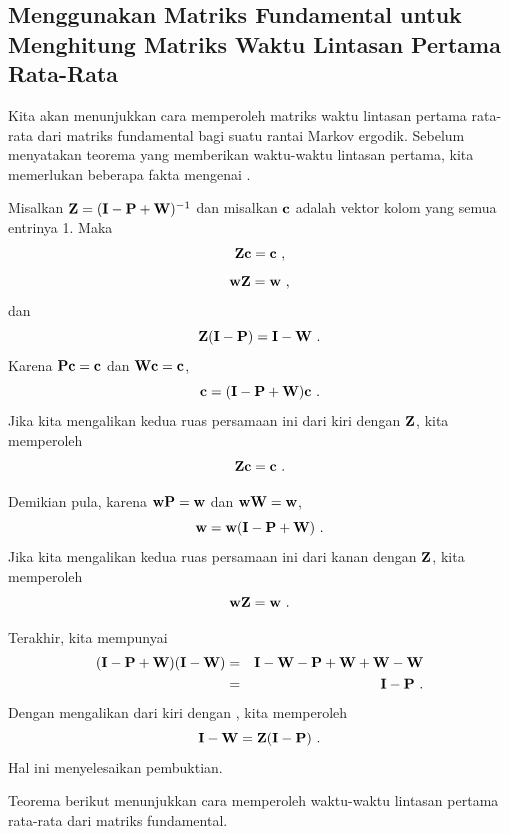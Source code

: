 \subsection*{Menggunakan Matriks Fundamental untuk Menghitung Matriks Waktu
Lintasan Pertama Rata-Rata}

Kita akan menunjukkan cara memperoleh matriks waktu lintasan pertama rata-rata
 dari matriks fundamental  bagi suatu rantai Markov ergodik.
Sebelum menyatakan teorema yang memberikan waktu-waktu lintasan pertama, kita
memerlukan beberapa fakta mengenai .

\begin{lemma}\label{thm 11.5.18}
Misalkan ${\mbox{\bf Z}\/} = ({\mbox{\bf I}\/} - {\mbox{\bf P}\/} + {\mbox{\bf W}\/})^{-1}$ dan misalkan ${\mbox{\bf c}\/}$
adalah vektor kolom yang semua entrinya 1. Maka
$$\mat{Z}\mat{c} = \mat{c}\ ,$$
$$\mat{w}\mat{Z} = \mat{w}\ ,$$
dan
$${\mbox{\bf Z}\/}({\mbox{\bf I}\/} - {\mbox{\bf P}\/}) = {\mbox{\bf I}\/} - {\mbox{\bf W}\/}\ .$$
\proof
Karena ${\mbox{\bf P}\/}{\mbox{\bf c}\/} = {\mbox{\bf c}\/}$ dan ${\mbox{\bf W}\/}{\mbox{\bf c}\/} = {\mbox{\bf c}\/}$,
$$\mat{c} = (\mat{I} - \mat{P} + \mat{W}) \mat{c}\ .$$
Jika kita mengalikan kedua ruas persamaan ini dari kiri dengan ${\mbox{\bf Z}\/}$, kita
memperoleh
$${\mbox{\bf Z}\/}{\mbox{\bf c}\/} = {\mbox{\bf c}\/}\ .$$
\par
Demikian pula, karena ${\mbox{\bf w}\/}{\mbox{\bf P}\/} = {\mbox{\bf w}\/}$ dan
${\mbox{\bf w}\/}{\mbox{\bf W}\/} = {\mbox{\bf w}\/}$,
$${\mbox{\bf w}\/} = {\mbox{\bf w}\/}({\mbox{\bf I}\/} - {\mbox{\bf P}\/} + {\mbox{\bf W}\/})\ .$$
Jika kita mengalikan kedua ruas persamaan ini dari kanan dengan ${\mbox{\bf Z}\/}$, kita
memperoleh
$${\mbox{\bf w}\/}{\mbox{\bf Z}\/} = {\mbox{\bf w}\/}\ .$$
\par
Terakhir, kita mempunyai
\begin{eqnarray*}
({\mbox{\bf I}\/} - {\mbox{\bf P}\/} + {\mbox{\bf W}\/})({\mbox{\bf I}\/} - {\mbox{\bf W}\/}) &=& 
{\mbox{\bf I}\/} - {\mbox{\bf W}\/} - {\mbox{\bf P}\/} + {\mbox{\bf W}\/} + {\mbox{\bf W}\/} - {\mbox{\bf W}\/}\\
    &=& {\mbox{\bf I}\/} - {\mbox{\bf P}\/}\ .
\end{eqnarray*}
Dengan mengalikan dari kiri dengan , kita memperoleh
$${\mbox{\bf I}\/} - {\mbox{\bf W}\/} = {\mbox{\bf Z}\/}({\mbox{\bf I}\/} - {\mbox{\bf P}\/})\ .$$
Hal ini menyelesaikan pembuktian.
\end{lemma}

Teorema berikut menunjukkan cara memperoleh waktu-waktu lintasan pertama
rata-rata dari matriks fundamental.

